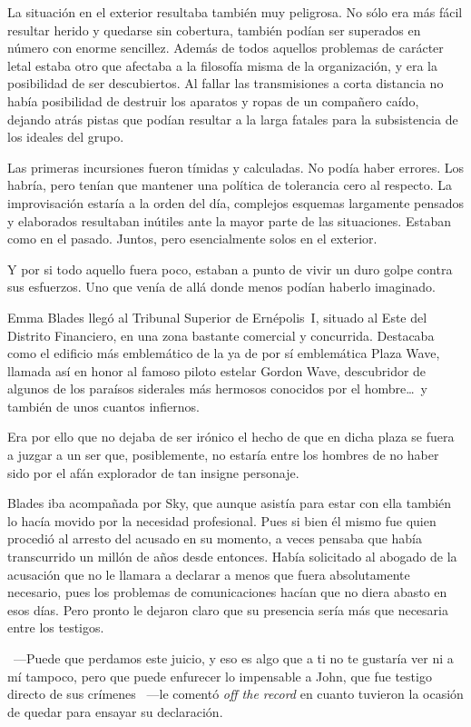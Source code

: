 La situación en el exterior resultaba también muy peligrosa. No sólo era más fácil resultar herido y quedarse sin cobertura, también podían ser superados en número con enorme sencillez. Además de todos aquellos problemas de carácter letal estaba otro que afectaba a la filosofía misma de la organización, y era la posibilidad de ser descubiertos. Al fallar las transmisiones a corta distancia no había posibilidad de destruir los aparatos y ropas de un compañero caído, dejando atrás pistas que podían resultar a la larga fatales para la subsistencia de los ideales del grupo.

Las primeras incursiones fueron tímidas y calculadas. No podía haber errores. Los habría, pero tenían que mantener una política de tolerancia cero al respecto. La improvisación estaría a la orden del día, complejos esquemas largamente pensados y elaborados resultaban inútiles ante la mayor parte de las situaciones. Estaban como en el pasado. Juntos, pero esencialmente solos en el exterior.

Y por si todo aquello fuera poco, estaban a punto de vivir un duro golpe contra sus esfuerzos. Uno que venía de allá donde menos podían haberlo imaginado.

\parbreak
Emma Blades llegó al Tribunal Superior de Ernépolis~I, situado al Este del Distrito Financiero, en una zona bastante comercial y concurrida. Destacaba como el edificio más emblemático de la ya de por sí emblemática Plaza Wave, llamada así en honor al famoso piloto estelar Gordon Wave, descubridor de algunos de los paraísos siderales más hermosos conocidos por el hombre\dots\ y también de unos cuantos infiernos.

Era por ello que no dejaba de ser irónico el hecho de que en dicha plaza se fuera a juzgar a un ser que, posiblemente, no estaría entre los hombres de no haber sido por el afán explorador de tan insigne personaje.

Blades iba acompañada por Sky, que aunque asistía para estar con ella también lo hacía movido por la necesidad profesional. Pues si bien él mismo fue quien procedió al arresto del acusado en su momento, a veces pensaba que había transcurrido un millón de años desde entonces. Había solicitado al abogado de la acusación que no le llamara a declarar a menos que fuera absolutamente necesario, pues los problemas de comunicaciones hacían que no diera abasto en esos días. Pero pronto le dejaron claro que su presencia sería más que necesaria entre los testigos.

~---Puede que perdamos este juicio, y eso es algo que a ti no te gustaría ver ni a mí tampoco, pero que puede enfurecer lo impensable a John, que fue testigo directo de sus crímenes ~---le comentó \emph{off the record} en cuanto tuvieron la ocasión de quedar para ensayar su declaración.

